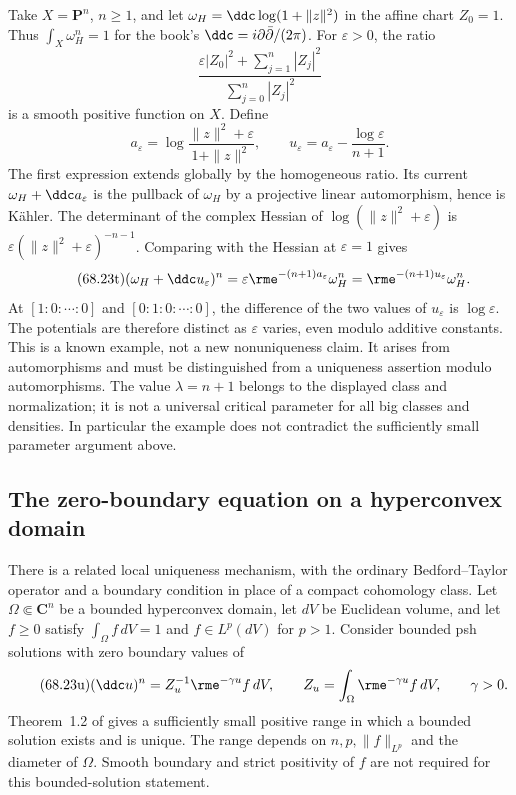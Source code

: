 Take $X=\mathbf P^n$, $n\geq1$, and let
$\omega_H=\ddc\log(1+\|z\|^2)$ in the affine chart $Z_0=1$.
Thus $\int_X\omega_H^n=1$ for the book's
$\ddc=i\partial\bar\partial/(2\pi)$.
For $\varepsilon>0$, the ratio
\[
 \frac{\varepsilon|Z_0|^2+\sum_{j=1}^n|Z_j|^2}
      {\sum_{j=0}^n|Z_j|^2}
\]
is a smooth positive function on $X$. Define
\[
\tag{68.23s}\label{eq:ytd-meanfield-projective-potential}
 a_\varepsilon
    =\log\frac{\|z\|^2+\varepsilon}{1+\|z\|^2},
 \qquad
 u_\varepsilon=a_\varepsilon
                    -\frac{\log\varepsilon}{n+1}.
\]
The first expression extends globally by the homogeneous ratio.
Its current $\omega_H+\ddc a_\varepsilon$ is the pullback of
$\omega_H$ by a projective linear automorphism, hence is K\"ahler.
The determinant of the complex Hessian of
$\log(\|z\|^2+\varepsilon)$ is
$\varepsilon(\|z\|^2+\varepsilon)^{-n-1}$.
Comparing with the Hessian at $\varepsilon=1$ gives
\[
\tag{68.23t}\label{eq:ytd-meanfield-projective-equation}
 (\omega_H+\ddc u_\varepsilon)^n
  =\varepsilon\rme^{-(n+1)a_\varepsilon}\omega_H^n
  =\rme^{-(n+1)u_\varepsilon}\omega_H^n.
\]
At $[1:0:\cdots:0]$ and $[0:1:0:\cdots:0]$, the difference
of the two values of $u_\varepsilon$ is $\log\varepsilon$.
The potentials are therefore distinct as $\varepsilon$ varies,
even modulo additive constants. This is a known example, not a
new nonuniqueness claim. It arises from automorphisms and must
be distinguished from a uniqueness assertion modulo automorphisms.
The value $\lambda=n+1$ belongs to the displayed class and
normalization; it is not a universal critical parameter for all
big classes and densities. In particular the example does not
contradict the sufficiently small parameter argument above.

\subsection{The zero-boundary equation on a hyperconvex domain}
\label{sec:ytd-meanfield-hyperconvex}

There is a related local uniqueness mechanism, with the ordinary
Bedford--Taylor operator and a boundary condition in place of a
compact cohomology class. Let $\Omega\Subset\mathbf C^n$ be a
bounded hyperconvex domain, let $dV$ be Euclidean volume, and
let $f\geq0$ satisfy $\int_\Omega f\,dV=1$ and
$f\in L^p(dV)$ for $p>1$. Consider bounded psh solutions
with zero boundary values of
\[
\tag{68.23u}\label{eq:ytd-meanfield-local-equation}
 (\ddc u)^n=Z_u^{-1}\rme^{-\gamma u}f\,dV,
 \qquad
 Z_u=\int_\Omega\rme^{-\gamma u}f\,dV,
 \qquad\gamma>0.
\]
Theorem~1.2 of \cite{LuPhung25MeanFieldV1} gives a sufficiently
small positive range in which a bounded solution exists and is
unique. The range depends on $n,p,\|f\|_{L^p}$ and the diameter
of $\Omega$. Smooth boundary and strict positivity of $f$ are
not required for this bounded-solution statement.

